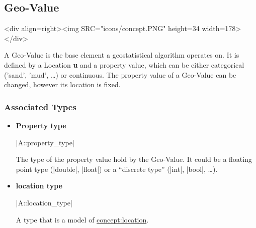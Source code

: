 \documentclass[12pt,twoside]{report}
\newcommand{\loc}[1]{{\bf #1}}
\begin{document}
% 
%    
%    
%  
% 
%    
%    
%  
% 
% 






% 
\subsection{Geo-Value}
\label{concept:geovalue}
\begin{htmlonly}
<div align=right><img SRC="icons/concept.PNG" height=34 width=178></div>
\end{htmlonly}

 A Geo-Value is the base element a geostatistical algorithm operates on. It is defined by a Location \loc{u} and a property value, which can be either categorical ('sand', 'mud', \ldots) or continuous.
The property value of a Geo-Value can be changed, however its location is fixed.

\htmlrule[CLEAR=all]  \subsubsection*{Associated Types}
\begin{itemize}

\item {\bf Property type}

  |A::property_type|

  The type of the property value hold by the Geo-Value. It could be a floating point type (|double|, |float|) or a ``discrete type'' (|int|, |bool|, \ldots).

  
\item {\bf location type}

  |A::location_type|
  
  A type that is a model of \hyperref{Location}{Location (see Section}{)}{concept:location}.


\end{itemize}
\end{document}
